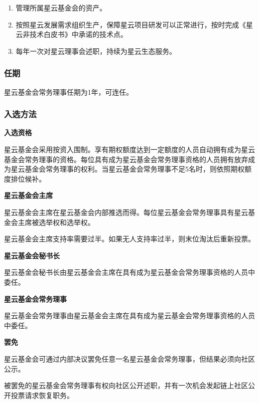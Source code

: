 \begin{enumerate}
	\item 管理所属星云基金会的资产。
	\item 按照星云发展需求组织生产，保障星云项目研发可以正常进行，按时完成《星云非技术白皮书》中承诺的技术点。
	\item 每年一次对星云理事会述职，持续为星云生态服务。
\end{enumerate}

\subsubsection{任期}

星云基金会常务理事任期为1年，可连任。

\subsubsection{入选方法}

\textbf{入选资格}

星云基金会采用按资入围制。享有期权额度达到一定额度的人员自动拥有成为星云基金会常务理事的资格。每位具有成为星云基金会常务理事资格的人员拥有放弃成为星云基金会常务理事的权利。当星云基金会常务理事不足5名时，则依照期权额度排位候补。

\vspace{2em}

\textbf{星云基金会主席}

星云基金会主席在星云基金会内部推选而得。每位星云基金会常务理事具有星云基金会主席被选举权和选举权。

星云基金会主席支持率需要过半。如果无人支持率过半，则末位淘汰后重新投票。

\vspace{2em}

\textbf{星云基金会秘书长}

星云基金会秘书长由星云基金会主席在具有成为星云基金会常务理事资格的人员中委任。

\vspace{2em}

\textbf{星云基金会常务理事}

星云基金会常务理事由星云基金会主席在具有成为星云基金会常务理事资格的人员中委任。

\vspace{2em}

\textbf{罢免}

星云基金会可通过内部决议罢免任意一名星云基金会常务理事，但结果必须向社区公示。

被罢免的星云基金会常务理事有权向社区公开述职，并有一次机会发起链上社区公开投票请求恢复职务。

